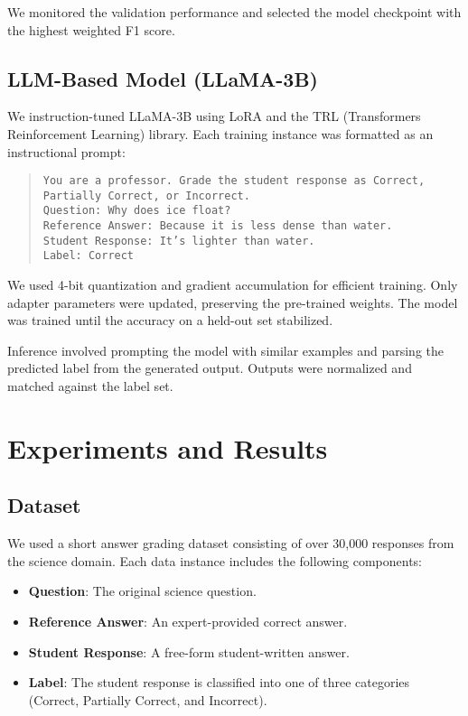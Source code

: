 \documentclass[11pt]{article}
\begin{document}
We monitored the validation performance and selected the model checkpoint with the highest weighted F1 score.


\subsection{LLM-Based Model (LLaMA-3B)}
We instruction-tuned LLaMA-3B using LoRA and the TRL (Transformers Reinforcement Learning) library. Each training instance was formatted as an instructional prompt:

\begin{quote}
\texttt{You are a professor. Grade the student response as Correct, Partially Correct, or Incorrect.\\
Question: Why does ice float?\\
Reference Answer: Because it is less dense than water.\\
Student Response: It’s lighter than water.\\
Label: Correct}
\end{quote}

We used 4-bit quantization and gradient accumulation for efficient training. Only adapter parameters were updated, preserving the pre-trained weights. The model was trained until the accuracy on a held-out set stabilized.

Inference involved prompting the model with similar examples and parsing the predicted label from the generated output. Outputs were normalized and matched against the label set.

\section{Experiments and Results}
\subsection{Dataset}

We used a short answer grading dataset consisting of over 30,000 responses from the science domain. Each data instance includes the following components:

\begin{itemize}
    \item \textbf{Question}: The original science question.
    \item \textbf{Reference Answer}: An expert-provided correct answer.
    \item \textbf{Student Response}: A free-form student-written answer.
    \item \textbf{Label}: The student response is classified into one of three categories (Correct, Partially Correct, and Incorrect).
\end{itemize}
\end{document}
